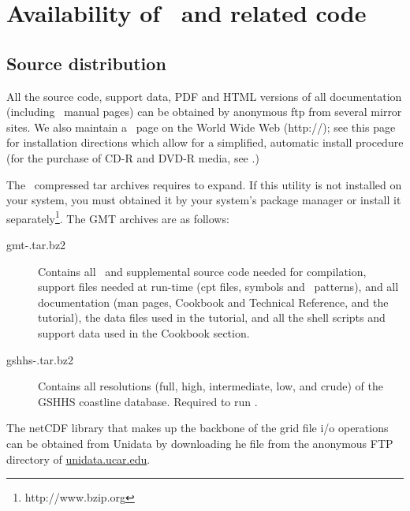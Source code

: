 %
%
\chapter{Availability of \gmt\ and related code}
\label{app:D}
\thispagestyle{headings}

\section{Source distribution}
All the source code, support data, PDF
and HTML versions of all documentation (including \UNIX\
manual pages) can be obtained by anonymous
ftp from several mirror sites.  We also maintain a \GMT\
page on the World Wide Web (http://\GMTSITE);
see this page for installation directions 
which allow for a simplified, automatic install procedure
(for the purchase of CD-R and DVD-R media, see .)

The \GMT\ compressed tar archives requires \progname{bzip2} to expand.  If this utility
is not installed on your system, you must obtained it by your system's package manager
or install it separately\footnote{http://www.bzip.org}.
The GMT archives are as follows:

\begin{description}

\item[gmt-\GMTDOCVERSION.tar.bz2] Contains all \GMT\ and supplemental source code needed for compilation, support files
	needed at run-time (cpt files, symbols and \PS\ patterns), and all documentation
	(man pages, Cookbook and Technical Reference, and the tutorial), the data files
	used in the tutorial, and all the shell scripts and support data used in the Cookbook section.

\item[gshhs-\GSHHSVERSION.tar.bz2] Contains all resolutions (full, high, intermediate,
low, and crude) of the GSHHS coastline database.  Required to run \GMT.

\end{description}


The netCDF library that makes up the backbone of the grid file
i/o operations can be obtained from Unidata by downloading he file
\filename{netcdf.tar.Z} from the anonymous FTP directory of
\underline{unidata.ucar.edu}.

